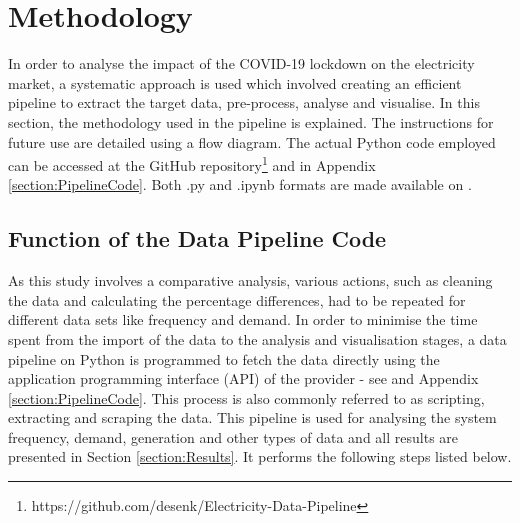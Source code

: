 \documentclass[energies,article,submit,moreauthors,pdftex]{Definitions/mdpi}
\begin{document}
\section{Methodology\label{section:Methodology}}
In order to analyse the impact of the COVID-19 lockdown on the electricity market, a systematic approach is used which involved creating an efficient pipeline to extract the target data, pre-process, analyse and visualise. In this section, the methodology used in the pipeline is explained. The instructions for future use are detailed using a flow diagram. The actual Python code employed can be accessed at the GitHub repository\footnote{https://github.com/desenk/Electricity-Data-Pipeline} \cite{KirliElectricityPipeline} and in Appendix \ref{section:PipelineCode}. Both .py and .ipynb formats are made available on \cite{KirliElectricityPipeline}.

\subsection{Function of the Data Pipeline Code}
As this study involves a comparative analysis, various actions, such as cleaning the data and calculating the percentage differences, had to be repeated for different data sets like frequency and demand. In order to minimise the time spent from the import of the data to the analysis and visualisation stages, a data pipeline on Python is programmed to fetch the data directly using the application programming interface (API) of the provider - see \cite{KirliElectricityPipeline} and Appendix \ref{section:PipelineCode}. This process is also commonly referred to as scripting, extracting and scraping the data. This pipeline is used for analysing the system frequency, demand, generation and other types of data and all results are presented in Section \ref{section:Results}.  It performs the following steps listed below. 
\end{document}
